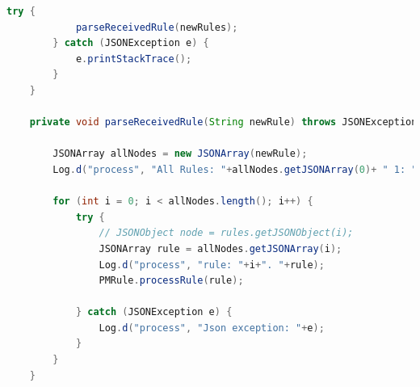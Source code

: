 \begin{lstlisting}[language=Java]
        try {
            parseReceivedRule(newRules);
        } catch (JSONException e) {
            e.printStackTrace();
        }
    }

    private void parseReceivedRule(String newRule) throws JSONException {

        JSONArray allNodes = new JSONArray(newRule);
        Log.d("process", "All Rules: "+allNodes.getJSONArray(0)+ " 1: "+allNodes.getJSONArray(1));

        for (int i = 0; i < allNodes.length(); i++) {
            try {
                // JSONObject node = rules.getJSONObject(i);
                JSONArray rule = allNodes.getJSONArray(i);
                Log.d("process", "rule: "+i+". "+rule);
                PMRule.processRule(rule);

            } catch (JSONException e) {
                Log.d("process", "Json exception: "+e);
            }
        }
    }
\end{lstlisting}

